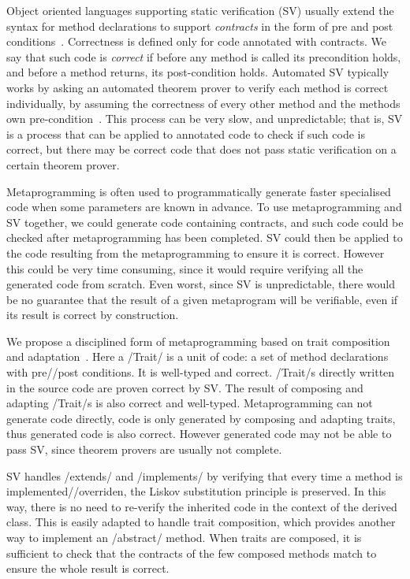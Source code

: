 \noindent Object oriented languages supporting static verification (SV) usually extend the syntax for method declarations
to support \emph{contracts} in the form of pre and post conditions~\cite{Meyer:1988:OSC:534929}.
Correctness is defined only for code annotated with contracts.
We say that such code is \emph{correct} if 
before any method is called its precondition holds, and before a method returns, its post-condition holds.
Automated SV typically works by asking an automated theorem prover to verify each method is correct individually, by assuming the correctness of every other method and the methods own pre-condition~\cite{barnett2004spec}. This process can be very slow, and unpredictable;
that is, SV is a process that can be applied to annotated code
to check if such code is correct, but there may be correct code that does not pass static verification
 on a certain theorem prover.

Metaprogramming is often used to programmatically generate faster specialised code 
when some parameters are known in advance. %
To use metaprogramming and SV together, we could generate code
containing contracts, and such code could be checked after metaprogramming has been completed.
SV could then be applied to the code resulting from the metaprogramming to ensure it is correct.
However this could be very time consuming, since it would require verifying all the generated code from scratch.
Even worst, since SV is unpredictable, there would be no guarantee that the result of a given metaprogram will be verifiable, even if its result is correct by construction.

We propose a disciplined form of metaprogramming based on trait composition and adaptation~\cite{scharli2003traits,servetto2014meta}.
Here a /Trait/ is a unit of code: a set of method declarations with pre//post conditions. It is well-typed and correct.
/Trait/s directly written in the source code
are proven correct by SV.
The result of composing and adapting /Trait/s is also correct and well-typed.
Metaprogramming can not generate code directly, code is only generated by composing and adapting traits, thus generated code is also correct.
However generated code may not be able to pass SV, since theorem provers are usually not complete.

SV handles /extends/ and /implements/ by verifying that every 
time a method is implemented//overriden, 
the Liskov substitution principle is preserved. In this way, there is no need to re-verify
the inherited code in the context of the derived class.
This is easily adapted
to handle trait composition, which provides another way to implement an /abstract/ method.
When traits are composed,
it is sufficient
to check that the contracts of the few composed methods match 
to ensure the whole result is correct.

